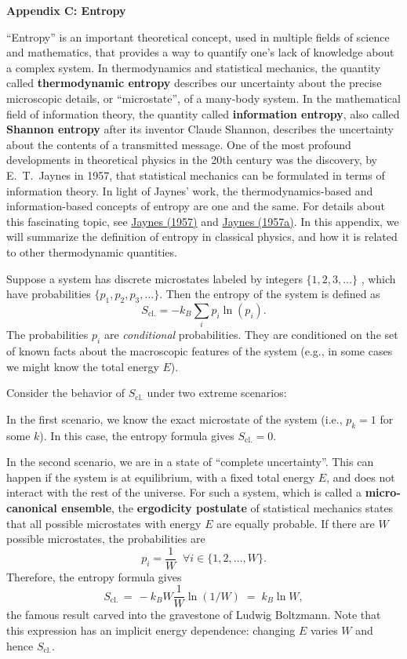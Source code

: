 \documentclass[pra,12pt]{revtex4}
\begin{document}
\begin{center}
{\large \textbf{Appendix C: Entropy}}
\end{center}

``Entropy'' is an important theoretical concept, used in multiple
fields of science and mathematics, that provides a way to quantify
one's lack of knowledge about a complex system.  In thermodynamics and
statistical mechanics, the quantity called \textbf{thermodynamic
  entropy} describes our uncertainty about the precise microscopic
details, or ``microstate'', of a many-body system.  In the
mathematical field of information theory, the quantity called
\textbf{information entropy}, also called \textbf{Shannon entropy}
after its inventor Claude Shannon, describes the uncertainty about the
contents of a transmitted message.  One of the most profound
developments in theoretical physics in the 20th century was the
discovery, by E.~T.~Jaynes in 1957, that statistical mechanics can be
formulated in terms of information theory.  In light of Jaynes' work,
the thermodynamics-based and information-based concepts of entropy are
one and the same.  For details about this fascinating topic, see
\hyperref[cite:jaynes]{Jaynes (1957)} and
\hyperref[cite:jaynes2]{Jaynes (1957a)}.  In this appendix, we will
summarize the definition of entropy in classical physics, and how it
is related to other thermodynamic quantities.

Suppose a system has discrete microstates labeled by integers
$\{1,2,3,\dots\}$ , which have probabilities $\{p_1, p_2, p_3,
\dots\}$.  Then the entropy of the system is defined as
$$S_{\mathrm{cl.}} = - k_B \sum_{i} p_i \ln(p_i).$$
The probabilities $p_i$ are \textit{conditional} probabilities.  They
are conditioned on the set of known facts about the macroscopic
features of the system (e.g., in some cases we might know the total
energy $E$).

Consider the behavior of $S_{\mathrm{cl.}}$ under two extreme
scenarios:

In the first scenario, we know the exact microstate of the system
(i.e., $p_k = 1$ for some $k$).  In this case, the entropy formula
gives $S_{\mathrm{cl.}} = 0$.

In the second scenario, we are in a state of ``complete uncertainty''.
This can happen if the system is at equilibrium, with a fixed total
energy $E$, and does not interact with the rest of the universe.  For
such a system, which is called a \textbf{micro-canonical ensemble},
the \textbf{ergodicity postulate} of statistical mechanics states that
all possible microstates with energy $E$ are equally probable.  If
there are $W$ possible microstates, the probabilities are
$$p_i = \frac{1}{W} \;\;\forall i \in \{1,2,\dots,W\}.$$
Therefore, the entropy formula gives
$$S_{\mathrm{cl.}} \,=\, -k_B W \frac{1}{W} \ln(1/W) \;=\; k_B \ln W,$$
the famous result carved into the gravestone of Ludwig Boltzmann.
Note that this expression has an implicit energy dependence: changing
$E$ varies $W$ and hence $S_{\mathrm{cl.}}$.
\end{document}
